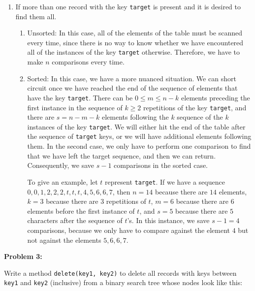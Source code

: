 \documentclass[10pt,letterpaper,final]{report}
\begin{document}
\begin{enumerate}
\begin{enumerate}
        \end{enumerate}
  \item If more than one record with the key \texttt{target} is present and it is desired to find them all.
        \begin{enumerate}
          \item Unsorted: In this case, all of the elements of the table must be scanned every time, since there is no way to know whether we have encountered all of the instances of the key \texttt{target} otherwise. Therefore, we have to make $n$ comparisons every time.
          \item Sorted: In this case, we have a more nuanced situation. We can short circuit once we have reached the end of the sequence of elements that have the key \texttt{target}. There can be $0 \le m \le n - k$ elements preceding the first instance in the sequence of $k \ge 2$ repetitions of the key \texttt{target}, and there are $s = n - m - k$ elements following the $k$ sequence of the $k$ instances of the key \texttt{target}. We will either hit the end of the table after the sequence of \texttt{target} keys, or we will have additional elements following them. In the second case, we only have to perform one comparison to find that we have left the target sequence, and then we can return. Consequently, we save $s-1$ comparisons in the sorted case.

                To give an example, let $t$ represent \texttt{target}. If we have a sequence $0,0,1,2,2,2,t,t,t,4,5,6,6,7$, then $n = 14$ because there are $14$ elements, $k = 3$ because there are $3$ repetitions of $t$, $m = 6$ because there are $6$ elements before the first instance of $t$, and $s=5$ because there are $5$ characters after the sequence of $t$'s. In this instance, we save $s-1 = 4$ comparisons, because we only have to compare against the element $4$ but not against the elements $5,6,6,7$.
        \end{enumerate}
\end{enumerate}

\pagebreak
\noindent\textbf{Problem 3:}
\medskip

Write a method \texttt{delete(key1, key2)} to delete all records with keys between \texttt{key1} and \texttt{key2} (inclusive) from a binary search tree whose nodes look like this:

\medskip

\end{document}
